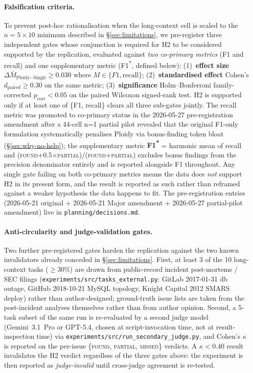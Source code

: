 \documentclass[11pt]{article}
\begin{document}
\paragraph{Falsification criteria.} To prevent post-hoc rationalisation when the long-context cell is scaled to the $n{=}5 \times 10$ minimum described in \S\ref{sec:limitations}, we pre-register three independent gates whose conjunction is required for H2 to be considered supported by the replication, evaluated against \emph{two co-primary metrics} (F1 and recall) and one supplementary metric (F1\textsuperscript{*}, defined below): (1)~\textbf{effect size} $\Delta \bar{M}_{\text{Ploidy}-\text{Single}} \geq 0.030$ where $M \in \{F1, \text{recall}\}$; (2)~\textbf{standardised effect} Cohen's $d_{\text{paired}} \geq 0.30$ on the same metric; (3)~\textbf{significance} Holm--Bonferroni family-corrected $p_{\text{corr}} < 0.05$ on the paired Wilcoxon signed-rank test. H2 is supported only if at least one of \{F1, recall\} clears all three sub-gates jointly. The recall metric was promoted to co-primary status in the 2026-05-27 pre-registration amendment after a 44-cell n=1 partial pilot revealed that the original F1-only formulation systematically penalises Ploidy via bonus-finding token bloat (\S\ref{sec:why-no-help}); the supplementary metric \textbf{F1\textsuperscript{*}} = harmonic mean of recall and (\textsc{found}+0.5$\times$\textsc{partial})/(\textsc{found}+\textsc{partial}) excludes bonus findings from the precision denominator entirely and is reported alongside F1 throughout. Any single gate failing on both co-primary metrics means the data does \emph{not} support H2 in its present form, and the result is reported as such rather than reframed against a weaker hypothesis the data happens to fit. The pre-registration entries (2026-05-21 original + 2026-05-21 Major amendment + 2026-05-27 partial-pilot amendment) live in \texttt{planning/decisions.md}.

\paragraph{Anti-circularity and judge-validation gates.} Two further pre-registered gates harden the replication against the two known invalidators already conceded in \S\ref{sec:limitations}. First, at least 3 of the 10 long-context tasks ($\geq 30\%$) are drawn from public-record incident post-mortems / SEC filings (\texttt{experiments/src/tasks\_external.py}: GitLab 2017-01-31 db outage, GitHub 2018-10-21 MySQL topology, Knight Capital 2012 SMARS deploy) rather than author-designed; ground-truth issue lists are taken from the post-incident analyses themselves rather than from author opinion. Second, a 5-task subset of the same run is re-evaluated by a second judge model (Gemini~3.1~Pro or GPT-5.4, chosen at script-invocation time, not at result-inspection time) via \texttt{experiments/src/run\_secondary\_judge.py}, and Cohen's $\kappa$ is reported on the per-issue \{\textsc{found}, \textsc{partial}, \textsc{missed}\} verdicts. A $\kappa < 0.40$ result invalidates the H2 verdict regardless of the three gates above: the experiment is then reported as \emph{judge-invalid} until cross-judge agreement is re-tested.
\end{document}
